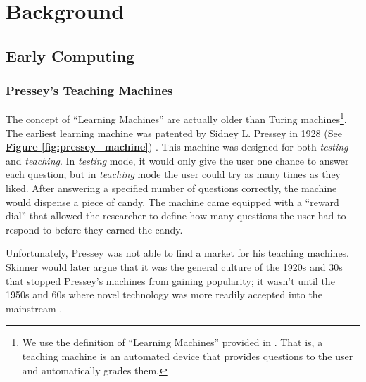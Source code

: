 \chapter{Background}
\section{Early Computing}

\subsection{Pressey's Teaching Machines}

\par The concept of ``Learning Machines'' are actually older than Turing machines\footnote{We use the definition of ``Learning Machines'' provided in \cite{benjamin1988history}. That is, a teaching machine is an automated device that provides questions to the user and automatically grades them.}. The earliest learning machine was patented by Sidney L. Pressey in 1928 (See \textbf{\hyperref[fig:pressey_machine]{Figure \ref*{fig:pressey_machine}}}) \cite{benjamin1988history}. This machine was designed for both \textit{testing} and \textit{teaching}. In \textit{testing} mode, it would only give the user one chance to answer each question, but in \textit{teaching} mode the user could try as many times as they liked. After answering a specified number of questions correctly, the machine would dispense a piece of candy. The machine came equipped with a ``reward dial'' that allowed the researcher to define how many questions the user had to respond to before they earned the candy.

\par Unfortunately, Pressey was not able to find a market for his teaching machines. Skinner would later argue that it was the general culture of the 1920s and 30s that stopped Pressey's machines from gaining popularity; it wasn't until the 1950s and 60s where novel technology was more readily accepted into the mainstream \cite{skinner1958teaching}.

